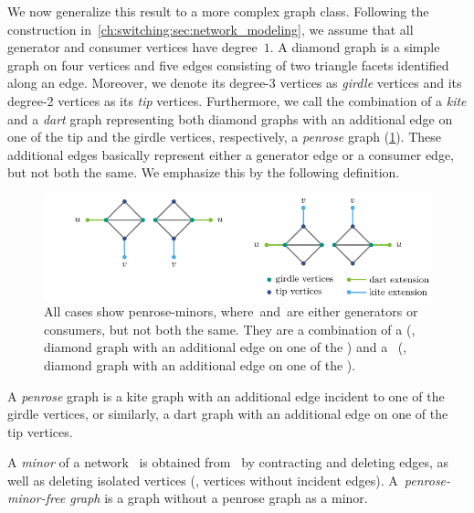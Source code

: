 % 
% 
We now generalize this result to a more complex graph class. Following the
construction in~\cref{ch:switching:sec:network_modeling}, we assume that all
generator and consumer vertices have degree~$1$. A diamond graph is a simple
graph on four vertices and five edges consisting of two triangle facets
identified along an edge. Moreover, we denote its degree-$3$ vertices as
\emph{girdle} vertices and its degree-2 vertices as its \emph{tip} vertices.
Furthermore, we call the combination of a \emph{kite} and a \emph{dart} graph
representing both diamond graphs with an additional edge on one of the tip and
the girdle vertices, respectively, a \emph{penrose} graph
(\cref{ch:switching:sec:exploit_structural_characteristics:fig:forbidden_minor}).
These additional edges basically represent either a generator edge or a consumer
edge, but not both the same. We emphasize this by the following definition.
% 
\begin{figure}[t!]
  \centering\includegraphics{switchplacement/figures/forbidden_minor.pdf}
  \caption[A description of penrose-minors.]{All cases show penrose-minors,
  where~\vertexa and~\vertexb are either generators or consumers, but not both
  the same. They are a combination of a  (\ie, diamond graph with an additional edge on one of the
  ) and
  a~ (\ie, diamond graph with an
  additional edge on one of the
  ).  
  }%
  \label{ch:switching:sec:exploit_structural_characteristics:fig:forbidden_minor}
\end{figure}
% 
\begin{definition}
    A \emph{penrose} graph is a kite graph with an additional edge incident to
    one of the girdle vertices, or similarly, a dart graph with an additional
    edge on one of the tip vertices.
    \label{ch:switching:sec:exploit_structural_characteristics:def:penrose-graph}
\end{definition}
% 
A \emph{minor} of a network~ is obtained
from~ by contracting and deleting edges, as well as deleting
isolated vertices (\ie, vertices without incident edges).
% 
A~\emph{penrose-minor-free graph} is a graph 
% 
without a penrose graph as a minor.
%


